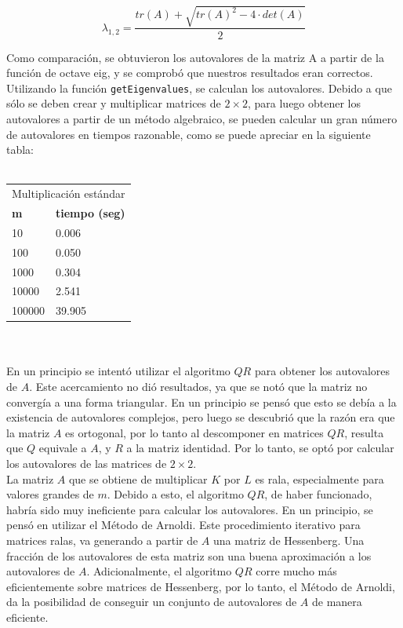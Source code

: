 \documentclass[a4paper,11pt]{article}
\begin{document}
\begin{equation}
    \lambda_{1,2} = \frac{tr(A) + \sqrt{tr(A)^2 - 4 \cdot det(A)}}{2}
\end{equation}

Como comparación, se obtuvieron los autovalores de la matriz A a partir de la función de octave eig,
y se comprobó que nuestros resultados eran correctos.\\

Utilizando la función \verb+getEigenvalues+, se calculan los autovalores. Debido a que
sólo se deben crear y multiplicar matrices de $2 \times 2$, para luego obtener los
autovalores a partir de un método algebraico, se pueden calcular un gran número
de autovalores en tiempos razonable, como se puede apreciar en la siguiente tabla:\\ \\
\begin{tabular}{|l||l|}
\hline
\multicolumn{2}{|l|}{Multiplicaci\'on est\'andar}\\
\cline{1-2}
\textbf{m}&\textbf{tiempo (seg)}\\
\hline\hline
10 & 0.006 \\
100 & 0.050\\
1000 & 0.304\\
10000 & 2.541\\
100000 & 39.905\\
\hline
\end{tabular}\\ \\

En un principio se intentó utilizar el algoritmo $QR$ para obtener los
autovalores de $A$. Este acercamiento no di\'o resultados, ya que se not\'o que la
matriz no converg\'ia a una forma triangular. En un principio se pens\'o que esto
se deb\'ia a la existencia de autovalores complejos, pero luego se descubri\'o que
la raz\'on era que la matriz $A$ es ortogonal, por lo tanto al descomponer en
matrices $QR$, resulta que $Q$ equivale a $A$, y $R$ a la matriz identidad. Por lo tanto, se opt\'o por
calcular los autovalores de las matrices de $2 \times 2$.\\

La matriz $A$ que se obtiene de multiplicar $K$ por $L$ es rala, especialmente para
valores grandes de $m$. Debido a esto, el algoritmo $QR$, de haber funcionado,
habr\'ia sido muy ineficiente para calcular los autovalores. En un principio, se
pens\'o en utilizar el M\'etodo de Arnoldi. Este procedimiento iterativo para
matrices ralas, va generando a partir de $A$ una matriz de Hessenberg. Una
fracci\'on de los autovalores de esta matriz son una buena aproximaci\'on a los
autovalores de $A$. Adicionalmente, el algoritmo $QR$ corre mucho m\'as
eficientemente sobre matrices de Hessenberg, por lo tanto, el M\'etodo de
Arnoldi, da la posibilidad de conseguir un conjunto de autovalores de $A$ de
manera eficiente. \\
\newpage
\end{document}
